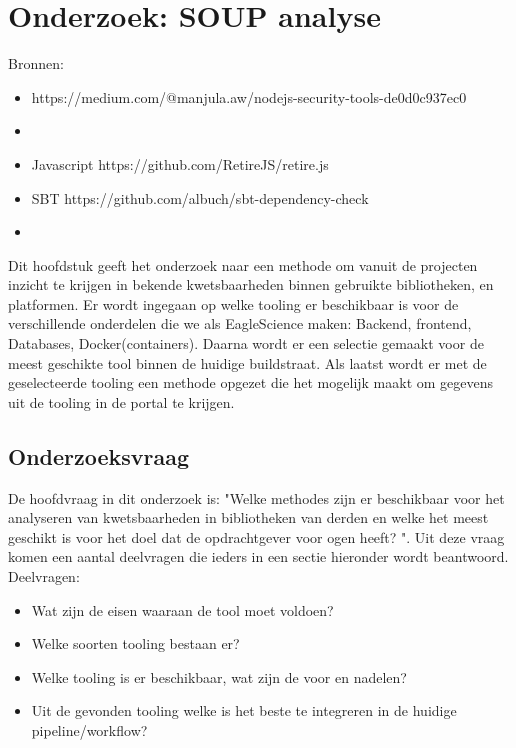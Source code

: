 




\chapter{Onderzoek: SOUP analyse}\label{ch:onderzoek:-soup-analyse} %
Bronnen:

\begin{itemize}
    \item https://medium.com/@manjula.aw/nodejs-security-tools-de0d0c937ec0
    \item
\end{itemize}
\begin{itemize}
    \item Javascript     https://github.com/RetireJS/retire.js
    \item SBT https://github.com/albuch/sbt-dependency-check
    \item
\end{itemize}

Dit hoofdstuk geeft het onderzoek naar een methode om vanuit de projecten inzicht te krijgen in bekende kwetsbaarheden binnen gebruikte bibliotheken, en platformen. Er wordt ingegaan op welke tooling er beschikbaar is voor de verschillende onderdelen die we als EagleScience maken: Backend, frontend, Databases, Docker(containers). Daarna wordt er een selectie gemaakt voor de meest geschikte tool binnen de huidige buildstraat. Als laatst wordt er met de geselecteerde tooling een methode opgezet die het mogelijk maakt om gegevens uit de tooling in de portal te krijgen.

\section{Onderzoeksvraag}\label{sec:onderzoeksvraag}
De hoofdvraag in dit onderzoek is:  "Welke methodes zijn er beschikbaar voor het analyseren van kwetsbaarheden in bibliotheken van derden en welke het meest geschikt is voor het doel dat de opdrachtgever voor ogen heeft? ". Uit deze vraag komen een aantal deelvragen die ieders in een sectie hieronder wordt beantwoord.
Deelvragen:
\smallskip
\begin{itemize}
    \item Wat zijn de eisen waaraan de tool moet voldoen?
    \item Welke soorten tooling bestaan er?
    \item Welke tooling is er beschikbaar, wat zijn de voor en nadelen?
    \item Uit de gevonden tooling welke is het beste te integreren in de huidige pipeline/workflow?

\end{itemize}

